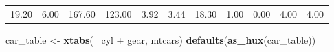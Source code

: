 \documentclass[]{article}
\newenvironment{Shaded}{\begin{snugshade}}{\end{snugshade}}
\newcommand{\KeywordTok}[1]{\textcolor[rgb]{0.13,0.29,0.53}{\textbf{{#1}}}}
\newcommand{\StringTok}[1]{\textcolor[rgb]{0.31,0.60,0.02}{{#1}}}
\newcommand{\NormalTok}[1]{{#1}}
\begin{document}
\begin{table}[h]
\begin{centering}
\begin{tabularx}{0.5\textwidth}{>{}X >{}X >{}X >{}X >{}X >{}X >{}X >{}X >{}X >{}X >{}X}
\multicolumn{1}{l}{\rule{0pt}{\baselineskip+4pt}\hspace*{4pt}19.20\hspace*{4pt}\rule[-4pt]{0pt}{4pt}} & \multicolumn{1}{l}{\rule{0pt}{\baselineskip+4pt}\hspace*{4pt} 6.00\hspace*{4pt}\rule[-4pt]{0pt}{4pt}} & \multicolumn{1}{l}{\rule{0pt}{\baselineskip+4pt}\hspace*{4pt}167.60\hspace*{4pt}\rule[-4pt]{0pt}{4pt}} & \multicolumn{1}{l}{\rule{0pt}{\baselineskip+4pt}\hspace*{4pt}123.00\hspace*{4pt}\rule[-4pt]{0pt}{4pt}} & \multicolumn{1}{l}{\rule{0pt}{\baselineskip+4pt}\hspace*{4pt} 3.92\hspace*{4pt}\rule[-4pt]{0pt}{4pt}} & \multicolumn{1}{l}{\rule{0pt}{\baselineskip+4pt}\hspace*{4pt} 3.44\hspace*{4pt}\rule[-4pt]{0pt}{4pt}} & \multicolumn{1}{l}{\rule{0pt}{\baselineskip+4pt}\hspace*{4pt}18.30\hspace*{4pt}\rule[-4pt]{0pt}{4pt}} & \multicolumn{1}{l}{\rule{0pt}{\baselineskip+4pt}\hspace*{4pt} 1.00\hspace*{4pt}\rule[-4pt]{0pt}{4pt}} & \multicolumn{1}{l}{\rule{0pt}{\baselineskip+4pt}\hspace*{4pt} 0.00\hspace*{4pt}\rule[-4pt]{0pt}{4pt}} & \multicolumn{1}{l}{\rule{0pt}{\baselineskip+4pt}\hspace*{4pt} 4.00\hspace*{4pt}\rule[-4pt]{0pt}{4pt}} & \multicolumn{1}{l}{\rule{0pt}{\baselineskip+4pt}\hspace*{4pt} 4.00\hspace*{4pt}\rule[-4pt]{0pt}{4pt}} \tabularnewline[-0.5pt]
\end{tabularx}
\par\end{centering}
\end{table}

\FloatBarrier

\begin{Shaded}
\begin{Highlighting}[]
\NormalTok{car_table <-}\StringTok{ }\KeywordTok{xtabs}\NormalTok{(~}\StringTok{ }\NormalTok{cyl +}\StringTok{ }\NormalTok{gear, mtcars)}
\KeywordTok{defaults}\NormalTok{(}\KeywordTok{as_hux}\NormalTok{(car_table))}
\end{Highlighting}
\end{Shaded}
\end{document}
